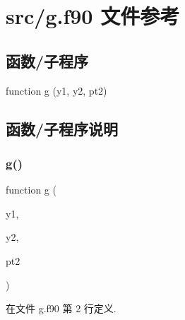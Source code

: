 \hypertarget{g_8f90}{}\section{src/g.f90 文件参考}
\label{g_8f90}
\subsection*{函数/子程序}
\begin{DoxyCompactItemize}
\item 
function \mbox{\hyperlink{g_8f90_ae6f69233cd20fb9f18eccb21a11b604f}{g}} (y1, y2, pt2)
\end{DoxyCompactItemize}


\subsection{函数/子程序说明}
\mbox{\label{g_8f90_ae6f69233cd20fb9f18eccb21a11b604f}} 
\subsubsection{\texorpdfstring{g()}{g()}}
{\footnotesize\ttfamily function g (\begin{DoxyParamCaption}\item[{}]{y1,  }\item[{}]{y2,  }\item[{}]{pt2 }\end{DoxyParamCaption})}



在文件 g.\+f90 第 2 行定义.


